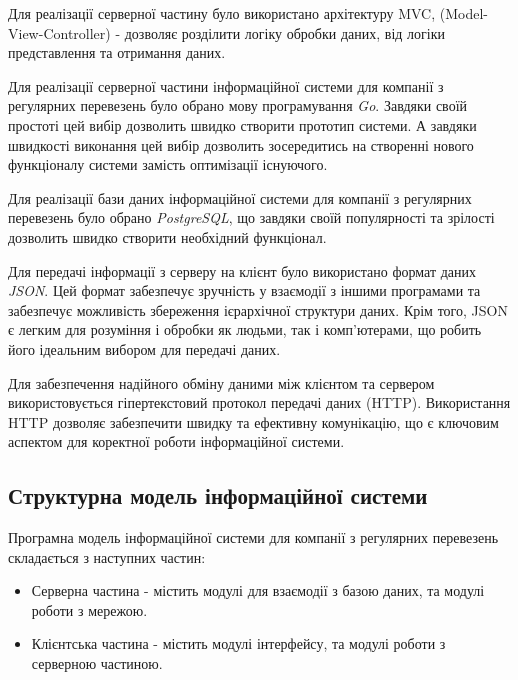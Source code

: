 \documentclass[oneside,14pt]{extarticle}
\begin{document}
Для реалізації серверної частину було використано архітектуру MVC, (Model-View-Controller) - дозволяє розділити логіку обробки даних, від логіки представлення та отримання даних.

Для реалізації серверної частини інформаційної системи для компанії з регулярних перевезень було обрано мову програмування \textit{Go}. Завдяки своїй простоті цей вибір дозволить швидко створити прототип системи. А завдяки швидкості виконання цей вибір дозволить зосередитись на створенні нового функціоналу системи замість оптимізації існуючого.

Для реалізації бази даних інформаційної системи для компанії з регулярних перевезень було обрано \textit{PostgreSQL}, що завдяки своїй популярності та зрілості дозволить швидко створити необхідний функціонал.

Для передачі інформації з серверу на клієнт було використано формат даних \textit{JSON}. Цей формат забезпечує зручність у взаємодії з іншими програмами та забезпечує можливість збереження ієрархічної структури даних. Крім того, JSON є легким для розуміння і обробки як людьми, так і комп'ютерами, що робить його ідеальним вибором для передачі даних.

Для забезпечення надійного обміну даними між клієнтом та сервером використовується гіпертекстовий протокол передачі даних (HTTP). Використання HTTP дозволяє забезпечити швидку та ефективну комунікацію, що є ключовим аспектом для коректної роботи інформаційної системи.

\subsection{Структурна модель інформаційної системи}
Програмна модель інформаційної системи для компанії з регулярних перевезень складається з наступних  частин:

\begin{itemize}
\item Серверна частина - містить модулі для взаємодії з базою даних, та модулі роботи з мережою.
\item Клієнтська частина - містить модулі інтерфейсу, та модулі роботи з серверною частиною.
\end{itemize}
\end{document}
